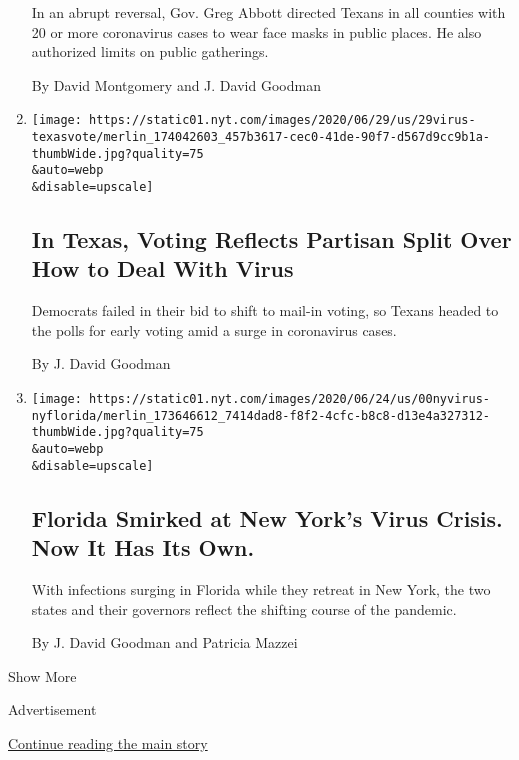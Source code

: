 \begin{enumerate}
  In an abrupt reversal, Gov. Greg Abbott directed Texans in all
  counties with 20 or more coronavirus cases to wear face masks in
  public places. He also authorized limits on public gatherings.

  By David Montgomery and J. David Goodman
\item
  \href{/2020/06/29/us/texas-early-voting-coronavirus.html}{}

  \texttt{[image: https://static01.nyt.com/images/2020/06/29/us/29virus-texasvote/merlin\_174042603\_457b3617-cec0-41de-90f7-d567d9cc9b1a-thumbWide.jpg?quality=75\\\&auto=webp\\\&disable=upscale]}

  \hypertarget{in-texas-voting-reflects-partisan-split-over-how-to-deal-with-virus}{%
  \subsection{In Texas, Voting Reflects Partisan Split Over How to Deal
  With
  Virus}\label{in-texas-voting-reflects-partisan-split-over-how-to-deal-with-virus}}

  Democrats failed in their bid to shift to mail-in voting, so Texans
  headed to the polls for early voting amid a surge in coronavirus
  cases.

  By J. David Goodman
\item
  \href{/2020/06/26/nyregion/florida-coronavirus-ny.html}{}

  \texttt{[image: https://static01.nyt.com/images/2020/06/24/us/00nyvirus-nyflorida/merlin\_173646612\_7414dad8-f8f2-4cfc-b8c8-d13e4a327312-thumbWide.jpg?quality=75\\\&auto=webp\\\&disable=upscale]}

  \hypertarget{florida-smirked-at-new-yorks-virus-crisis-now-it-has-its-own}{%
  \subsection{Florida Smirked at New York's Virus Crisis. Now It Has Its
  Own.}\label{florida-smirked-at-new-yorks-virus-crisis-now-it-has-its-own}}

  With infections surging in Florida while they retreat in New York, the
  two states and their governors reflect the shifting course of the
  pandemic.

  By J. David Goodman and Patricia Mazzei
\end{enumerate}

Show More

Advertisement

\protect\hyperlink{after-mid2}{Continue reading the main story}

